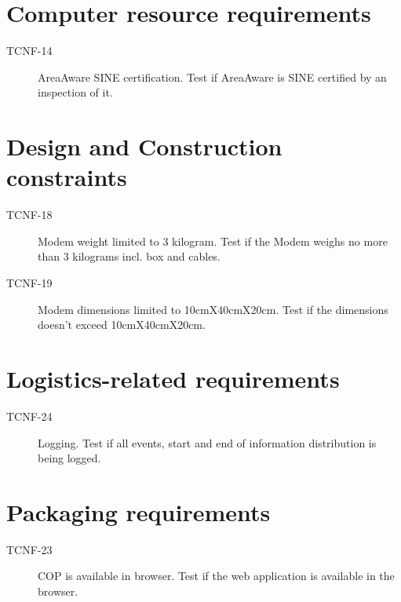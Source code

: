 \section{Computer resource requirements}
\begin{description}
	\item[TCNF-14] AreaAware SINE certification. Test if AreaAware is SINE certified by an inspection of it.
\end{description}

\section{Design and Construction constraints}
\begin{description}
	\item[TCNF-18] Modem weight limited to 3 kilogram. Test if the Modem weighs no more than 3 kilograms incl. box and cables.
	\item[TCNF-19] Modem dimensions limited to 10cmX40cmX20cm. Test if the dimensions doesn't exceed 10cmX40cmX20cm.
\end{description}

\section{Logistics-related requirements}
\begin{description}
	\item[TCNF-24] Logging. Test if all events, start and end of information distribution is being logged.
\end{description}

\section{Packaging requirements}
\begin{description}
	\item[TCNF-23] COP is available in browser. Test if the web application is available in the browser.
\end{description}